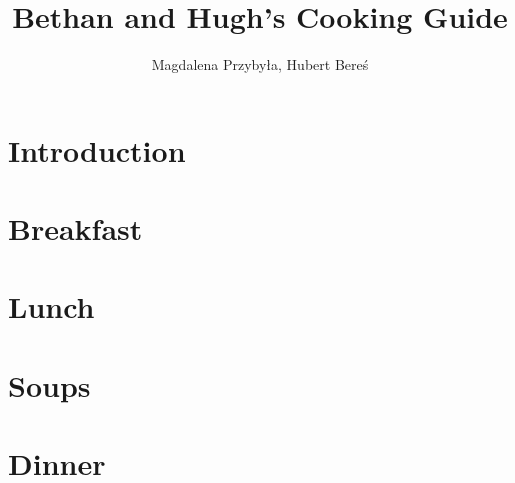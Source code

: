 \documentclass[%
titlepage,
b5paper,
twoside,
11pt
]{book}
\begin{document}
\frontmatter
\title{Bethan and Hugh's Cooking Guide}
\author{Magdalena Przybyła, Hubert Bereś}

\maketitle
\thispagestyle{empty}
\newpage

\tableofcontents

\mainmatter
\chapter{Introduction}


\newpage

\chapter{Breakfast}

\newpage

\newpage

\newpage

\newpage

\newpage

\newpage

\chapter{Lunch}


\newpage

\newpage

\newpage

\newpage

\newpage

\newpage

\newpage

\chapter{Soups}


\newpage

\newpage

\newpage

\newpage

\newpage


\chapter{Dinner}


\newpage

\newpage

\newpage

\newpage

\newpage

\newpage

\newpage

\newpage
\newpage

\newpage

\newpage

\newpage

\newpage

\newpage

\newpage
\end{document}
